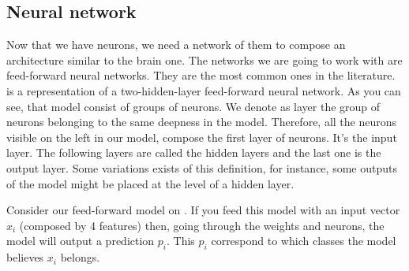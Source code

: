 	\subsection{Neural network}
		Now that we have neurons, we need a network of them to compose an architecture similar to the brain one. The networks we are going to work with are feed-forward neural networks. They are the most common ones in the literature.  is a representation of a two-hidden-layer feed-forward neural network. As you can see, that model consist of groups of neurons. We denote as layer the group of neurons belonging to the same deepness in the model. Therefore, all the neurons visible on the left in our model, compose the first layer of neurons. It's the input layer. The following layers are called the hidden layers and the last one is the output layer. Some variations exists of this definition, for instance, some outputs of the model might be placed at the level of a hidden layer.

		Consider our feed-forward model on . If you feed this model with an input vector $x_i$ (composed by 4 features) then, going through the weights and neurons, the model will output a prediction $p_i$. This $p_i$ correspond to which classes the model believes $x_i$ belongs.
		

